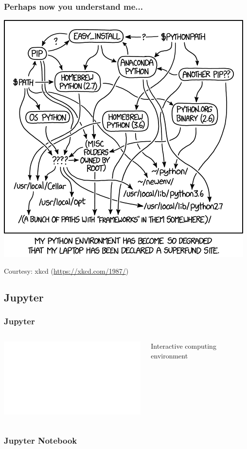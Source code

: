 \documentclass[aspectratio=169]{beamer}
\begin{document}
\begin{frame}
    \frametitle{Perhaps now you understand me...}
    \centering
    \includegraphics[scale=0.35]{images/xkcd-python-env.png}

    {\small Courtesy: xkcd (\url{https://xkcd.com/1987/})}
\end{frame}

\subsection{Jupyter}

\begin{frame}
    \frametitle{Jupyter}
    \begin{columns}
        \begin{center}
            \includegraphics<2->[width=0.7\columnwidth]{images/jupyter-logo.pdf}
        \end{center}
        { {\LARGE Interactive computing environment}}
    \end{columns}
\end{frame}

\begin{frame}
    \frametitle{Jupyter Notebook}
\end{frame}
\end{document}

